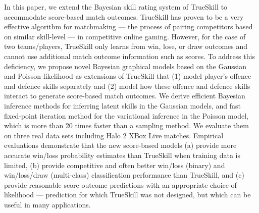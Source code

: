 In this paper, we extend the Bayesian skill rating system of TrueSkill to accommodate
score-based match outcomes. TrueSkill has proven to be a very
effective algorithm for matchmaking --- the process of pairing
competitors based on similar skill-level --- in competitive online
gaming. However, for the case of two teams/players, TrueSkill only
learns from win, lose, or draw outcomes and cannot use additional
match outcome information such as scores. To address this deficiency,
we propose novel Bayesian graphical models based on the Gaussian and Poisson likelihood as extensions of TrueSkill
that (1) model player's offence and defence skills separately and (2)
model how these offence and defence skills interact to generate
score-based match outcomes.  We derive efficient Bayesian inference methods for inferring latent skills in the Gaussian models, and fast fixed-point iteration method for the variational inference in the Poisson model, which is more than 20 times faster than a sampling method. We evaluate them on three real data sets including Halo 2 XBox Live matches. Empirical evaluations demonstrate that the new
score-based models (a) provide more accurate win/loss probability
estimates than TrueSkill when training data is limited,
(b) provide competitive and often better win/loss  (binary) and win/loss/draw (multi-class) classification
performance than TrueSkill, and (c) provide reasonable score outcome predictions with an
appropriate choice of likelihood --- prediction for which TrueSkill was not
designed, but which can be useful in many applications.